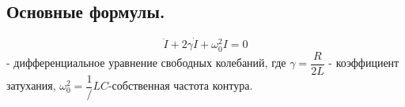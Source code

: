 \documentclass[a4paper, 12pt, twoside]{article}
\begin{document}
\begin{figure}[H]
	\centering
	\begin{minipage}[h]{0.3\linewidth}
	\end{minipage}
	\begin{minipage}[h]{0.34\linewidth}
	\end{minipage}
	\begin{minipage}[h]{0.34\linewidth}
	\end{minipage}
	
\end{figure}

\subsection{Основные формулы.}
$$\ddot I + 2\gamma \dot I + \omega_{0}^2 I = 0$$ - дифференциальное уравнение свободных колебаний, где $ \gamma =\dfrac{ R}{2L} $ - коэффициент затухания, $ \omega_{0}^2=
\dfrac{1}/{LC} $-собственная частота контура.
\end{document}
